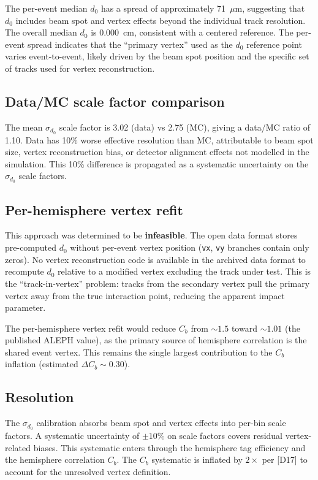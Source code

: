 \documentclass[11pt,a4paper]{article}
\begin{document}
The per-event median $d_0$ has a spread of approximately 71~$\mu$m, suggesting that
$d_0$ includes beam spot and vertex effects beyond the individual track resolution.
The overall median $d_0$ is 0.000~cm, consistent with a centered reference. The
per-event spread indicates that the ``primary vertex'' used as the $d_0$ reference
point varies event-to-event, likely driven by the beam spot position and the
specific set of tracks used for vertex reconstruction.

\subsection{Data/MC scale factor comparison}

The mean $\sigma_{d_0}$ scale factor is 3.02 (data) vs 2.75 (MC), giving a data/MC
ratio of 1.10. Data has 10\% worse effective resolution than MC, attributable to beam
spot size, vertex reconstruction bias, or detector alignment effects not modelled in the
simulation. This 10\% difference is propagated as a systematic uncertainty on the
$\sigma_{d_0}$ scale factors.

\subsection{Per-hemisphere vertex refit}

This approach was determined to be \textbf{infeasible}. The open data format stores
pre-computed $d_0$ without per-event vertex position (\texttt{vx}, \texttt{vy}
branches contain only zeros). No vertex reconstruction code is available in the
archived data format to recompute $d_0$ relative to a modified vertex excluding the
track under test. This is the ``track-in-vertex'' problem: tracks from the secondary
vertex pull the primary vertex away from the true interaction point, reducing the
apparent impact parameter.

The per-hemisphere vertex refit would reduce $C_b$ from $\sim 1.5$ toward $\sim 1.01$
(the published ALEPH value), as the primary source of hemisphere correlation is the
shared event vertex. This remains the single largest contribution to the $C_b$
inflation (estimated $\Delta C_b \sim 0.30$).

\subsection{Resolution}

The $\sigma_{d_0}$ calibration absorbs beam spot and vertex effects into per-bin scale
factors. A systematic uncertainty of $\pm 10\%$ on scale factors covers residual
vertex-related biases. This systematic enters through the hemisphere tag efficiency
and the hemisphere correlation $C_b$. The $C_b$ systematic is inflated by $2\times$
per [D17] to account for the unresolved vertex definition.
\end{document}
